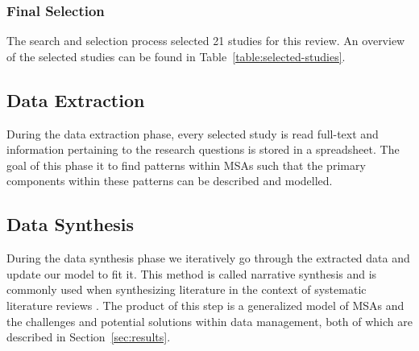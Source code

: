 \subsubsection{Final Selection}
The search and selection process selected 21 studies for this review. An overview of the selected studies can be found in Table~\ref{table:selected-studies}.


\subsection{Data Extraction}
During the data extraction phase, every selected study is read full-text and information pertaining to the research questions is stored in a spreadsheet. The goal of this phase it to find patterns within MSAs such that the primary components within these patterns can be described and modelled.

\subsection{Data Synthesis}
During the data synthesis phase we iteratively go through the extracted data and update our model to fit it. This method is called narrative synthesis and is commonly used when synthesizing literature in the context of systematic literature reviews \cite{popay2006guidance}. The product of this step is a generalized model of MSAs and the challenges and potential solutions within data management, both of which are described in Section~\ref{sec:results}.


